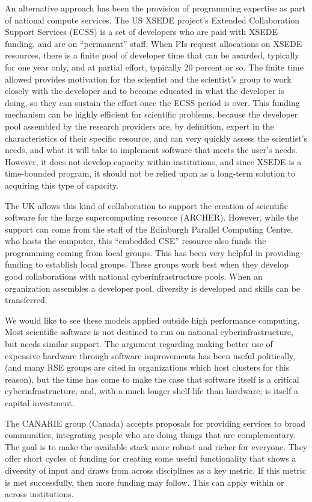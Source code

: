 An alternative approach has been the provision of programming expertise as part
of national compute services. The US XSEDE project's Extended Collaboration Support 
Services (ECSS) is a set of developers who are paid with XSEDE funding, and are
on ``permanent'' staff. When PIs request allocations on XSEDE resources, there
is a finite pool of developer time that can be awarded, typically for one year
only, and at partial effort, typically 20 percent or so. The finite time allowed
provides motivation for the scientist and the scientist's group to work closely with the
developer and to become educated in what the developer is doing, so they can
sustain the effort once the ECSS period is over. This funding mechanism can be
highly efficient for scientific problems, because the developer pool assembled
by the research providers are, by definition, expert in the characteristics of
their specific resource, and can very quickly assess the scientist's needs, and
what it will take to implement software that meets the user's needs. However, it
does not develop capacity within institutions, and since XSEDE is a time-bounded
program, it should not be relied upon as a long-term solution to acquiring this
type of capacity.

The UK allows this kind of collaboration to support the creation of scientific
software for the large supercomputing resource (ARCHER). However, while the
support can come from the staff of the Edinburgh Parallel Computing Centre,
who hosts the computer, this ``embedded CSE'' resource also funds the
programming coming from local groups. This has been very helpful in providing
funding to establish local groups. These groups work best when they develop good
collaborations with national cyberinfrastructure pools. When an organization
assembles a developer pool, diversity is developed and skills can be
transferred.

We would like to see these models applied outside high performance computing.
Most scientific software is not destined to run on national cyberinfrastructure,
but needs similar support. The argument regarding making better use of expensive
hardware through software improvements has been useful politically, (and many
RSE groups are cited in organizations which host clusters for this reason), but
the time has come to make the case that software itself is a critical
cyberinfrastructure, and, with a much longer shelf-life than hardware, is itself
a capital investment.

The CANARIE group (Canada) accepts proposals for providing services to broad
communities, integrating people who are doing things that are complementary. The
goal is to make the available stack more robust and richer for everyone. They
offer short cycles of funding for creating some useful functionality that shows
a diversity of input and draws from across disciplines as a key metric, If this
metric is met successfully, then more funding may follow. This can apply within
or across institutions.

